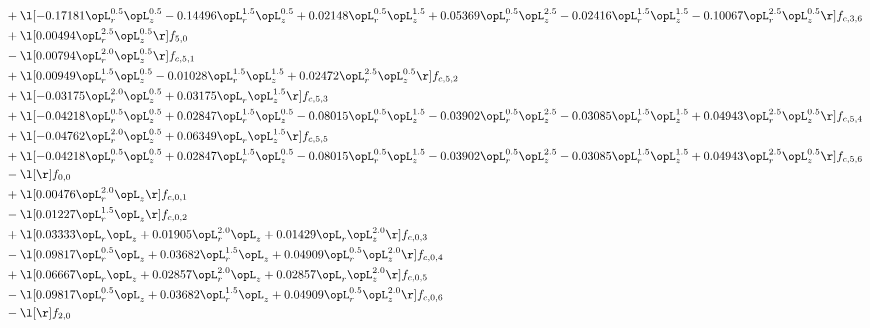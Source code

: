 \begin{alignat}{2}
& + \l[  -0.17181 \opL_r^{0.5} \opL_z^{0.5}   -0.14496 \opL_r^{1.5} \opL_z^{0.5} +  0.02148 \opL_r^{0.5} \opL_z^{1.5} +  0.05369 \opL_r^{0.5} \opL_z^{2.5}   -0.02416 \opL_r^{1.5} \opL_z^{1.5}   -0.10067 \opL_r^{2.5} \opL_z^{0.5}  \r] f_{c,3,6} \nonumber \\ 
& + \l[  0.00494 \opL_r^{2.5} \opL_z^{0.5}  \r] f_{5,0} \nonumber \\ 
& - \l[  0.00794 \opL_r^{2.0} \opL_z^{0.5}  \r] f_{c,5,1} \nonumber \\ 
& + \l[  0.00949 \opL_r^{1.5} \opL_z^{0.5}   -0.01028 \opL_r^{1.5} \opL_z^{1.5} +  0.02472 \opL_r^{2.5} \opL_z^{0.5}  \r] f_{c,5,2} \nonumber \\ 
& + \l[  -0.03175 \opL_r^{2.0} \opL_z^{0.5} +  0.03175 \opL_r \opL_z^{1.5}  \r] f_{c,5,3} \nonumber \\ 
& + \l[  -0.04218 \opL_r^{0.5} \opL_z^{0.5} +  0.02847 \opL_r^{1.5} \opL_z^{0.5}   -0.08015 \opL_r^{0.5} \opL_z^{1.5}   -0.03902 \opL_r^{0.5} \opL_z^{2.5}   -0.03085 \opL_r^{1.5} \opL_z^{1.5} +  0.04943 \opL_r^{2.5} \opL_z^{0.5}  \r] f_{c,5,4} \nonumber \\ 
& + \l[  -0.04762 \opL_r^{2.0} \opL_z^{0.5} +  0.06349 \opL_r \opL_z^{1.5}  \r] f_{c,5,5} \nonumber \\ 
& + \l[  -0.04218 \opL_r^{0.5} \opL_z^{0.5} +  0.02847 \opL_r^{1.5} \opL_z^{0.5}   -0.08015 \opL_r^{0.5} \opL_z^{1.5}   -0.03902 \opL_r^{0.5} \opL_z^{2.5}   -0.03085 \opL_r^{1.5} \opL_z^{1.5} +  0.04943 \opL_r^{2.5} \opL_z^{0.5}  \r] f_{c,5,6} \nonumber \\ 
& - \l[  \r] f_{0,0} \nonumber \\ 
& + \l[  0.00476 \opL_r^{2.0} \opL_z  \r] f_{c,0,1} \nonumber \\ 
& - \l[  0.01227 \opL_r^{1.5} \opL_z  \r] f_{c,0,2} \nonumber \\ 
& + \l[  0.03333 \opL_r \opL_z +  0.01905 \opL_r^{2.0} \opL_z +  0.01429 \opL_r \opL_z^{2.0}  \r] f_{c,0,3} \nonumber \\ 
& - \l[  0.09817 \opL_r^{0.5} \opL_z +  0.03682 \opL_r^{1.5} \opL_z +  0.04909 \opL_r^{0.5} \opL_z^{2.0}  \r] f_{c,0,4} \nonumber \\ 
& + \l[  0.06667 \opL_r \opL_z +  0.02857 \opL_r^{2.0} \opL_z +  0.02857 \opL_r \opL_z^{2.0}  \r] f_{c,0,5} \nonumber \\ 
& - \l[  0.09817 \opL_r^{0.5} \opL_z +  0.03682 \opL_r^{1.5} \opL_z +  0.04909 \opL_r^{0.5} \opL_z^{2.0}  \r] f_{c,0,6} \nonumber \\ 
& - \l[  \r] f_{2,0} \nonumber \\ 

\end{alignat}
